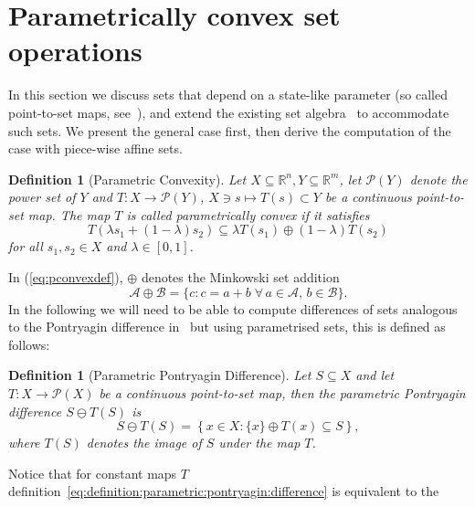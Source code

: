\documentclass[letterpaper, 10pt, conference]{ieeeconf} %
\newtheorem{defn}[thm]{Definition}
\begin{document}
\section{Parametrically convex set operations}\label{sec:parametrically:convex:set:operations}
In this section we discuss sets that depend on a state-like parameter (so called point-to-set maps, 
see~\cite{Hogan:1973}), and extend the existing set algebra~\cite{blanchini:2007} to 
accommodate such sets. We present the general case first, then derive the computation of
the case with piece-wise affine sets.
%
%
    \begin{defn}[Parametric Convexity]\label{def:parametric:convexity}
      Let $X\subseteq\mathbb R^n, Y\subseteq\mathbb R^m$, let $\mathcal P(Y)$ denote the power set of $Y$ 
      and $T:X\rightarrow \mathcal P(Y)$, $X\ni s\mapsto T(s)\subset Y$ be a 
      continuous point-to-set map. The map $T$ is called \emph{parametrically convex} if it satisfies
      \begin{equation}\label{eq:pconvexdef}
        T(\lambda s_1 + (1-\lambda)s_2)\subseteq\lambda T(s_1) \oplus (1-\lambda) T(s_2)
      \end{equation}
      for all $s_1,s_2\in X$ and $\lambda\in[0,1]$.
    \end{defn}
%
In (\ref{eq:pconvexdef}), $\oplus$ denotes the Minkowski set addition
      \begin{equation}
        \mathcal A\oplus\mathcal B = \{c : c = a + b\; \forall\,a\in\mathcal A,\, b\in\mathcal B\}.
      \end{equation}
%
    In the following we will need to be able to compute differences of sets
    analogous to the Pontryagin difference in~\cite{Kolmanovsky:1998} but using parametrised 
    sets, this is defined as follows:
%
    \begin{defn}[Parametric Pontryagin Difference]\label{def:parametric:pontryagin:difference}
Let $S\subseteq X$ and let $T:X\to\mathcal P(X)$ be a continuous point-to-set map,
then the \emph{parametric Pontryagin difference} $S\ominus T(S)$ is 
      \begin{equation}\label{eq:definition:parametric:pontryagin:difference}
        S\ominus T(S) = \left\{x\in X: \{x\} \oplus T(x)\subseteq S\right\},
      \end{equation}
      where $T(S)$ denotes the image of $S$ under the map $T$. 
    \end{defn}
%
    Notice that for constant maps $T$
    definition~\eqref{eq:definition:parametric:pontryagin:difference} is equivalent to the 
\end{document}
